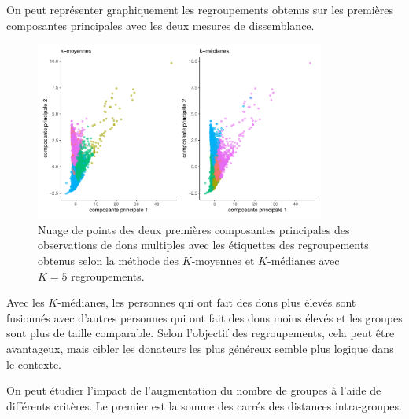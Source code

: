 \documentclass[
  11pt,
  letterpaper,
]{scrbook}
\newenvironment{Shaded}{\begin{snugshade}}{\end{snugshade}}
\newcommand{\CommentTok}[1]{\textcolor[rgb]{0.37,0.37,0.37}{#1}}
\newcommand{\ControlFlowTok}[1]{\textcolor[rgb]{0.00,0.23,0.31}{#1}}
\newcommand{\FunctionTok}[1]{\textcolor[rgb]{0.28,0.35,0.67}{#1}}
\newcommand{\NormalTok}[1]{\textcolor[rgb]{0.00,0.23,0.31}{#1}}
\newcommand{\OtherTok}[1]{\textcolor[rgb]{0.00,0.23,0.31}{#1}}
\newcommand{\SpecialCharTok}[1]{\textcolor[rgb]{0.37,0.37,0.37}{#1}}
\theoremstyle{definition}
\theoremstyle{remark}
\begin{document}
On peut représenter graphiquement les regroupements obtenus sur les
premières composantes principales avec les deux mesures de dissemblance.

\begin{figure}[ht!]

{\centering \includegraphics[width=0.85\textwidth,height=\textheight]{regroupements_files/figure-pdf/fig-acpkmoy5-1.pdf}

}

\caption{\label{fig-acpkmoy5}Nuage de points des deux premières
composantes principales des observations de dons multiples avec les
étiquettes des regroupements obtenus selon la méthode des \(K\)-moyennes
et \(K\)-médianes avec \(K=5\) regroupements.}

\end{figure}

Avec les \(K\)-médianes, les personnes qui ont fait des dons plus élevés
sont fusionnés avec d'autres personnes qui ont fait des dons moins
élevés et les groupes sont plus de taille comparable. Selon l'objectif
des regroupements, cela peut être avantageux, mais cibler les donateurs
les plus généreux semble plus logique dans le contexte.

On peut étudier l'impact de l'augmentation du nombre de groupes à l'aide
de différents critères. Le premier est la somme des carrés des distances
intra-groupes.

\begin{Shaded}
\end{Shaded}
\end{document}
